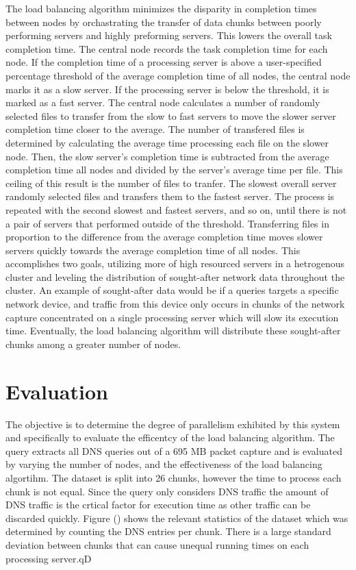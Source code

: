 \documentclass{article}
\begin{document}
\begin{multicols}{2}
The load balancing algorithm minimizes the disparity in completion times between nodes by orchastrating the transfer of data chunks between poorly performing servers and highly preforming servers. This lowers the overall task completion time.  The central node records the task completion time for each node.  If the completion time of a processing server is above a user-specified percentage threshold of the average completion time of all nodes, the central node marks it as a slow server. If the processing server is below the threshold, it is marked as a fast server.  The central node calculates a number of randomly selected files to transfer from the slow to fast servers to move the slower server completion time closer to the average. The number of transfered files is determined by calculating the average time processing each file on the slower node.  Then, the slow server's completion time is subtracted from the average completion time all nodes and divided by the server's average time per file. This ceiling of this result is the number of files to tranfer. The slowest overall server randomly selected files and transfers them to the fastest server.  The process is repeated with the second slowest and fastest servers, and so on, until there is not a pair of servers that performed outside of the threshold.  Transferring files in proportion to the difference from the average completion time moves slower servers quickly towards the average completion time of all nodes.  This accomplishes two goals, utilizing more of high resourced servers in a hetrogenous cluster and leveling the distribution of sought-after network data throughout the cluster.  An example of sought-after data would be if a queries targets a specific network device, and traffic from this device only occurs in chunks of the network capture concentrated on a single processing server which will slow its execution time.  Eventually, the load balancing algorithm will distribute these sought-after chunks among a greater number of nodes. 

\section*{Evaluation} 


The objective is to determine the degree of parallelism exhibited by this system and specifically to evaluate the efficentcy of the load balancing algorithm. The query extracts all DNS queries out of a 695 MB packet capture and is evaluated by varying the number of nodes, and the effectiveness of the load balancing algortihm.  The dataset is split into 26 chunks, however the time to process each chunk is not equal.  Since the query only considers DNS traffic the amount of DNS traffic is the crtical factor for execution time as other traffic can be discarded quickly.  Figure () shows the relevant statistics of the dataset which was determined by counting the DNS entries per chunk.  There is a large standard deviation between chunks that can cause unequal running times on each processing server.qD


\end{multicols}
\end{document}
